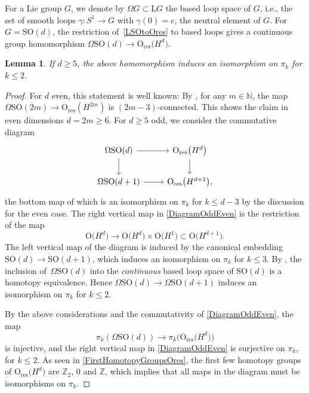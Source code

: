 \documentclass[10pt,a4paper]{amsart}
\numberwithin{equation}{section}
\newtheorem{Lemma}[Theorem]{Lemma}
\newcommand{\N}{\mathbb{N}}
\newcommand{\Z}{\mathbb{Z}}
\newcommand{\SO}{\mathrm{SO}}
\newcommand{\res}{\mathrm{res}}
\renewcommand{\O}{\mathrm{O}}
\renewcommand{\L}{\mathrm{L}}
\begin{document}
For a Lie group $G$, we denote by $\Omega G \subset \L G$ the based loop space of $G$, i.e., the set of smooth loops $\gamma\colon S^1 \to G$ with $\gamma(0) = e$, the neutral element of $G$.
For $G = \SO(d)$, the restriction of~\eqref{LSOtoOres} to based loops gives a continuous group homomorphism $\Omega \SO(d) \longrightarrow \O_{\res}\big(H^d\big)$.

\begin{Lemma} \label{LemmaPi2Iso}
If $d \geq 5$, the above homomorphism induces an isomorphism on $\pi_k$ for $k \leq 2$.
\end{Lemma}

\begin{proof}
For $d$ even, this statement is well known: By \cite[Proposition~12.5.2]{PressleySegal}, for any $m \in \N$, the map $\Omega\SO(2m) \to \O_{\res}(H^{2m})$ is $(2m-3)$-connected.
This shows the claim in even dimensions $d=2m \geq 6$.
For $d \geq 5$ odd, we consider the commutative diagram
\begin{equation} \label{DiagramOddEven}
\begin{tikzcd}
\Omega\SO(d) \ar[d] \ar[r] & \O_{\res}\big(H^d\big) \ar[d] \\
\Omega\SO(d+1) \ar[r] & \O_{\res}\big(H^{d+1}\big),
\end{tikzcd}
\end{equation}
the bottom map of which is an isomorphism on $\pi_k$ for $k \leq d-3$ by the discussion for the even case.
The right vertical map in \eqref{DiagramOddEven} is the restriction of the map
\[\O\big(H^d\big) \to \O\big(H^d\big) \times \O\big(H^1\big) \subset \O\big(H^{d+1}\big).\]
 The left vertical map of the diagram is induced by the canonical embedding $\SO(d) \to \SO(d+1)$, which induces an isomorphism on $\pi_k$ for $k \leq 3$. By \cite[Proposition~7.1]{CareyCrowleyMurray}, the inclusion of~$\Omega \SO(d)$ into the \emph{continuous} based loop space of $\SO(d)$ is a homotopy equivalence. Hence $\Omega \SO(d) \to \Omega\SO(d+1)$ induces an isomorphism on $\pi_k$ for $k \leq 2$.

By the above considerations and the commutativity of \eqref{DiagramOddEven}, the map \[\pi_k(\Omega\SO(d)) \to \pi_k\big(\O_{\res}\big(H^d\big)\big)\]
 is injective, and the right vertical map in \eqref{DiagramOddEven} is surjective on $\pi_k$, for $k \leq 2$.
As seen in \eqref{FirstHomotopyGroupsOres}, the first few homotopy groups of $\O_{\res}\big(H^d\big)$ are $\Z_2$, $0$ and $\Z$, which implies that all maps in the diagram must be isomorphisms on $\pi_k$.
\end{proof}
\end{document}
